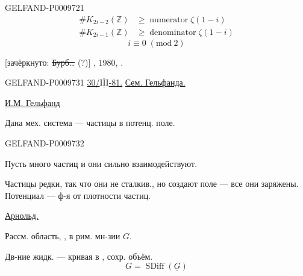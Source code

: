 \begin{GelfandAdjacentEvidence}{GELFAND-P000972}{1}
\[
\begin{aligned}
 \#K_{2i-2}(\mathbb Z)&\geqslant\operatorname{numerator}\zeta(1-i)\\
 \#K_{2i-1}(\mathbb Z)&\geqslant\operatorname{denominator}\zeta(1-i)
\end{aligned}
\]
\[
 i\equiv0\;(\mathrm{mod}\ 2)
\]

[зачёркнуто: \sout{Бурб…} (?)] , 1980, .
\end{GelfandAdjacentEvidence}


\begin{GelfandAdjacentEvidence}{GELFAND-P000973}{1}
\underline{30/\(\underline{\overline{\mathrm{III}}}\)-81.}\quad
\underline{Сем. Гельфанда.}

\underline{И.М. Гельфанд}


Дана мех. система --- частицы в потенц. поле.
\end{GelfandAdjacentEvidence}
\begin{GelfandAdjacentEvidence}{GELFAND-P000973}{2}


Пусть много частиц и они сильно взаимодействуют.

Частицы редки, так что они не сталкив., но создают поле --- все они заряжены. Потенциал --- ф-я от плотности частиц.

\underline{\underline{Арнольд.}}\quad{}


Рассм. область, , в рим. мн-зии $G$.

Дв-ние жидк. --- кривая в , сохр. объём.
\[
 G=\operatorname{SDiff}(\underline{G})
\]
\end{GelfandAdjacentEvidence}

